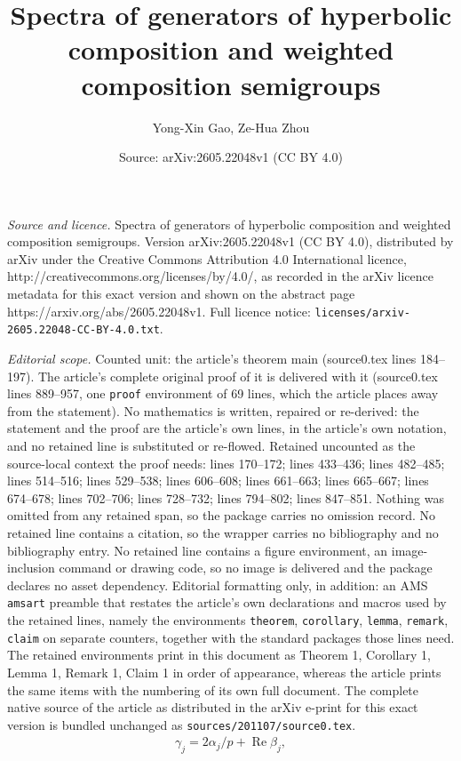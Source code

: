 \documentclass[10pt,a4paper]{amsart}
\title{Spectra of generators of hyperbolic composition and weighted composition semigroups}
\author{Yong-Xin Gao, Ze-Hua Zhou}
\date{Source: arXiv:2605.22048v1 (CC BY 4.0)}
\begin{document}
\maketitle

\noindent\emph{Source and licence.} Spectra of generators of hyperbolic composition and weighted composition semigroups. Version arXiv:2605.22048v1 (CC BY 4.0), distributed by arXiv under the Creative Commons Attribution 4.0 International licence, http://creativecommons.org/licenses/by/4.0/, as recorded in the arXiv licence metadata for this exact version and shown on the abstract page https://arxiv.org/abs/2605.22048v1. Full licence notice: \texttt{licenses/arxiv-2605.22048-CC-BY-4.0.txt}.\par\smallskip

\noindent\textit{Editorial scope.} Counted unit: the article's theorem main (source0.tex lines 184--197). The article's complete original proof of it is delivered with it (source0.tex lines 889--957, one \texttt{proof} environment of 69 lines, which the article places away from the statement). No mathematics is written, repaired or re-derived: the statement and the proof are the article's own lines, in the article's own notation, and no retained line is substituted or re-flowed.  Retained uncounted as the source-local context the proof needs: lines 170--172; lines 433--436; lines 482--485; lines 514--516; lines 529--538; lines 606--608; lines 661--663; lines 665--667; lines 674--678; lines 702--706; lines 728--732; lines 794--802; lines 847--851.  Nothing was omitted from any retained span, so the package carries no omission record.  No retained line contains a citation, so the wrapper carries no bibliography and no bibliography entry.  No retained line contains a figure environment, an image-inclusion command or drawing code, so no image is delivered and the package declares no asset dependency.  Editorial formatting only, in addition: an AMS \texttt{amsart} preamble that restates the article's own declarations and macros used by the retained lines, namely the environments \texttt{theorem}, \texttt{corollary}, \texttt{lemma}, \texttt{remark}, \texttt{claim} on separate counters, together with the standard packages those lines need.  The retained environments print in this document as Theorem 1, Corollary 1, Lemma 1, Remark 1, Claim 1 in order of appearance, whereas the article prints the same items with the numbering of its own full document.  The complete native source of the article as distributed in the arXiv e-print for this exact version is bundled unchanged as \texttt{sources/201107/source0.tex}.
\begin{align}\label{gamma}
\gamma_j=2\alpha_j/p+ \operatorname{Re}\beta_j,
\end{align}
\end{document}

